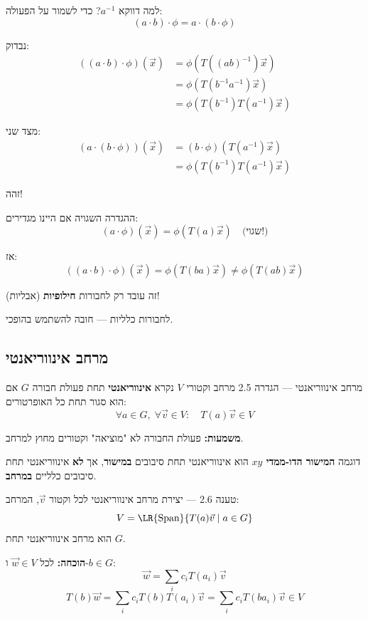 \begin{notebox}{למה דווקא $a^{-1}$?}
כדי לשמור על הפעולה:
\[
(a \cdot b) \cdot \phi = a \cdot (b \cdot \phi)
\]

נבדוק:
\begin{align*}
((a \cdot b) \cdot \phi)(\vec{x}) 
&= \phi(T((ab)^{-1})\vec{x}) \\
&= \phi(T(b^{-1}a^{-1})\vec{x}) \\
&= \phi(T(b^{-1})T(a^{-1})\vec{x})
\end{align*}

מצד שני:
\begin{align*}
(a \cdot (b \cdot \phi))(\vec{x}) 
&= (b \cdot \phi)(T(a^{-1})\vec{x}) \\
&= \phi(T(b^{-1})T(a^{-1})\vec{x})
\end{align*}

זהה! 
\end{notebox}

\begin{warningbox}{ההגדרה השגויה}
אם היינו מגדירים:
\[
(a \cdot \phi)(\vec{x}) = \phi(T(a)\vec{x}) \quad \text{(שגוי!)}
\]

אז:
\[
((a \cdot b) \cdot \phi)(\vec{x}) = \phi(T(ba)\vec{x}) \neq \phi(T(ab)\vec{x})
\]

זה עובד רק לחבורות \textbf{חילופיות} (אבליות)!

לחבורות כלליות — חובה להשתמש בהופכי.
\end{warningbox}

\subsection{מרחב אינווריאנטי}

\begin{definitionbox}{מרחב אינווריאנטי — הגדרה 2.5}
מרחב וקטורי $V$ נקרא \textbf{אינווריאנטי} תחת פעולת חבורה $G$ אם הוא סגור תחת כל האופרטורים:
\[
\forall a \in G, \; \forall \vec{v} \in V: \quad T(a)\vec{v} \in V
\]

\textbf{משמעות:} פעולת החבורה לא "מוציאה" וקטורים מחוץ למרחב.
\end{definitionbox}

\begin{examplebox}{דוגמה}
\textbf{המישור הדו-ממדי $xy$} הוא אינווריאנטי תחת סיבובים \textbf{במישור}, אך \textbf{לא} אינווריאנטי תחת סיבובים כלליים \textbf{במרחב}.
\end{examplebox}

\begin{theorembox}{טענה 2.6 — יצירת מרחב אינווריאנטי}
לכל וקטור $\vec{v}$, המרחב:
\[
V = \text{\LR{Span}}\{T(a)\vec{v} \mid a \in G\}
\]
הוא מרחב אינווריאנטי תחת $G$.

\textbf{הוכחה:} לכל $\vec{w} \in V$ ו-$b \in G$:
\[
\vec{w} = \sum_i c_i T(a_i)\vec{v}
\]
\[
T(b)\vec{w} = \sum_i c_i T(b)T(a_i)\vec{v} = \sum_i c_i T(ba_i)\vec{v} \in V
\]
\end{theorembox}

